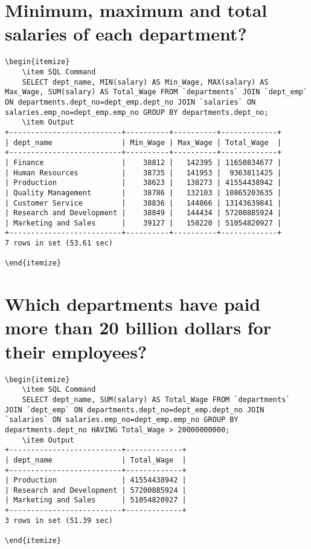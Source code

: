 \documentclass[13pt,a4paper]{report}
\begin{document}
\section{ Minimum, maximum and total salaries of each department? }
\begin{lstlisting}
\begin{itemize}
	\item SQL Command
	SELECT dept_name, MIN(salary) AS Min_Wage, MAX(salary) AS Max_Wage, SUM(salary) AS Total_Wage FROM `departments` JOIN `dept_emp` ON departments.dept_no=dept_emp.dept_no JOIN `salaries` ON salaries.emp_no=dept_emp.emp_no GROUP BY departments.dept_no;
	\item Output
+--------------------------+----------+----------+-------------+
| dept_name                | Min_Wage | Max_Wage | Total_Wage  |
+--------------------------+----------+----------+-------------+
| Finance                  |    38812 |   142395 | 11650834677 |
| Human Resources          |    38735 |   141953 |  9363811425 |
| Production               |    38623 |   138273 | 41554438942 |
| Quality Management       |    38786 |   132103 | 10865203635 |
| Customer Service         |    38836 |   144866 | 13143639841 |
| Research and Development |    38849 |   144434 | 57200885924 |
| Marketing and Sales      |    39127 |   158220 | 51054820927 |
+--------------------------+----------+----------+-------------+
7 rows in set (53.61 sec)

\end{itemize}
\end{lstlisting}

\section{ Which departments have paid more than 20 billion dollars for their employees? }
\begin{lstlisting}
\begin{itemize}
	\item SQL Command
	SELECT dept_name, SUM(salary) AS Total_Wage FROM `departments` JOIN `dept_emp` ON departments.dept_no=dept_emp.dept_no JOIN `salaries` ON salaries.emp_no=dept_emp.emp_no GROUP BY departments.dept_no HAVING Total_Wage > 20000000000;
	\item Output
+--------------------------+-------------+
| dept_name                | Total_Wage  |
+--------------------------+-------------+
| Production               | 41554438942 |
| Research and Development | 57200885924 |
| Marketing and Sales      | 51054820927 |
+--------------------------+-------------+
3 rows in set (51.39 sec)

\end{itemize}
\end{lstlisting}
\end{document}
